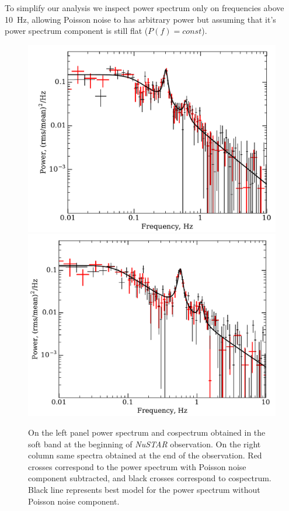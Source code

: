 \documentclass[a4paper,fleqn,usenatbib]{mnras}
\begin{document}
To simplify our analysis we inspect power spectrum only on frequencies above 10~Hz, allowing Poisson noise to has arbitrary power but assuming that it's power spectrum component is still flat ($P(f) = const$).

\begin{figure}
        \includegraphics[trim=0 0 0 0.65cm, clip, width=\columnwidth]{spectrum_model_and_cospectrum0.pdf}
        \includegraphics[width=\columnwidth, height = 0.83\columnwidth]{spectrum_model_and_cospectrum10.pdf}
        \caption{On the left panel power spectrum and cospectrum obtained in the soft band at the beginning of {\it NuSTAR} observation. 
        On the right column same spectra obtained at the end of the observation.
        Red crosses correspond to the power spectrum with Poisson noise component subtracted, and black crosses correspond to cospectrum.
        Black line represents best model for the power spectrum without Poisson noise component.}
        \label{fig:qpo}
\end{figure}
\end{document}
